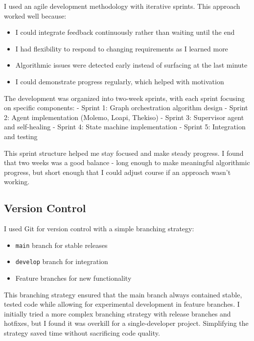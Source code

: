 I used an agile development methodology with iterative sprints. This approach worked well because:

\begin{itemize}
    \item I could integrate feedback continuously rather than waiting until the end
    \item I had flexibility to respond to changing requirements as I learned more
    \item Algorithmic issues were detected early instead of surfacing at the last minute
    \item I could demonstrate progress regularly, which helped with motivation
\end{itemize}

The development was organized into two-week sprints, with each sprint focusing on specific components:
- Sprint 1: Graph orchestration algorithm design
- Sprint 2: Agent implementation (Molemo, Loapi, Thekiso)
- Sprint 3: Supervisor agent and self-healing
- Sprint 4: State machine implementation
- Sprint 5: Integration and testing

This sprint structure helped me stay focused and make steady progress. I found that two weeks was a good balance - long enough to make meaningful algorithmic progress, but short enough that I could adjust course if an approach wasn't working.

\subsection{Version Control}

I used Git for version control with a simple branching strategy:

\begin{itemize}
    \item \texttt{main} branch for stable releases
    \item \texttt{develop} branch for integration
    \item Feature branches for new functionality
\end{itemize}

This branching strategy ensured that the main branch always contained stable, tested code while allowing for experimental development in feature branches. I initially tried a more complex branching strategy with release branches and hotfixes, but I found it was overkill for a single-developer project. Simplifying the strategy saved time without sacrificing code quality.

